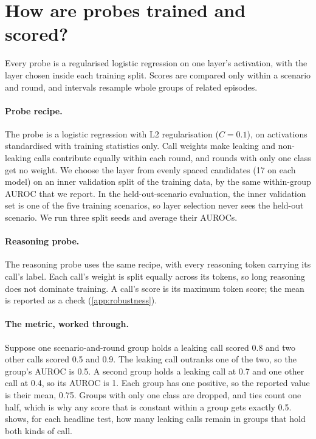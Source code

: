 \section{How are probes trained and scored?}
\label{app:probes}

Every probe is a regularised logistic regression on one layer's activation, with the layer chosen inside each training split.
Scores are compared only within a scenario and round, and intervals resample whole groups of related episodes.

\paragraph{Probe recipe.}
The probe is a logistic regression with L2 regularisation ($C = 0.1$), on activations standardised with training statistics only.
Call weights make leaking and non-leaking calls contribute equally within each round, and rounds with only one class get no weight.
We choose the layer from evenly spaced candidates (17 on each model) on an inner validation split of the training data, by the same within-group AUROC that we report.
In the held-out-scenario evaluation, the inner validation set is one of the five training scenarios, so layer selection never sees the held-out scenario.
We run three split seeds and average their AUROCs.

\paragraph{Reasoning probe.}
The reasoning probe uses the same recipe, with every reasoning token carrying its call's label.
Each call's weight is split equally across its tokens, so long reasoning does not dominate training.
A call's score is its maximum token score; the mean is reported as a check (\cref{app:robustness}).

\paragraph{The metric, worked through.}
Suppose one scenario-and-round group holds a leaking call scored 0.8 and two other calls scored 0.5 and 0.9.
The leaking call outranks one of the two, so the group's AUROC is 0.5.
A second group holds a leaking call at 0.7 and one other call at 0.4, so its AUROC is 1.
Each group has one positive, so the reported value is their mean, 0.75.
Groups with only one class are dropped, and ties count one half, which is why any score that is constant within a group gets exactly 0.5.
 shows, for each headline test, how many leaking calls remain in groups that hold both kinds of call.

